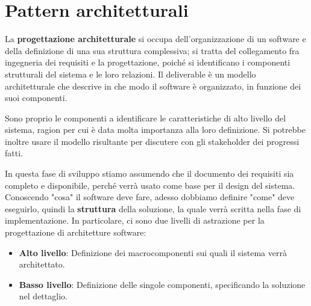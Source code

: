 \section{Pattern architetturali}
La \textbf{progettazione architetturale} si occupa dell'organizzazione di un software e della definizione di una sua struttura complessiva; si tratta del collegamento fra ingegneria dei requisiti e la progettazione, poiché si identificano i componenti strutturali del sistema e le loro relazioni. Il deliverable è un modello architetturale che descrive in che modo il software è organizzato, in funzione dei suoi componenti.\par
Sono proprio le componenti a identificare le caratteristiche di alto livello del sistema, ragion per cui è data molta importanza alla loro definizione. Si potrebbe inoltre usare il modello risultante per discutere con gli stakeholder dei progressi fatti.\newline

\noindent In questa fase di sviluppo stiamo assumendo che il documento dei requisiti sia completo e disponibile, perché verrà usato come base per il design del sistema. Conoscendo "cosa" il software deve fare, adesso dobbiamo definire "come" deve eseguirlo, quindi la \textbf{struttura} della soluzione, la quale verrà scritta nella fase di implementazione. In particolare, ci sono due livelli di astrazione per la progettazione di architetture software: \begin{itemize}
	\item \textbf{Alto livello}: Definizione dei macrocomponenti sui quali il sistema verrà architettato.
	\item \textbf{Basso livello}: Definizione delle singole componenti, specificando la soluzione nel dettaglio.
\end{itemize}

